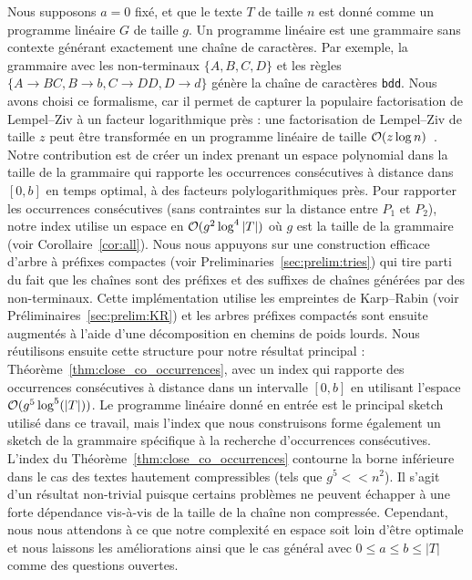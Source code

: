 Nous supposons $a=0$ fixé, et que le texte $T$ de taille $n$ est donné comme un programme linéaire $G$ de taille $g$. Un programme linéaire est une grammaire sans contexte générant exactement une chaîne de caractères. Par exemple, la grammaire avec les non-terminaux $\{A,B,C,D\}$ et les règles $\{A \rightarrow BC, B \rightarrow b, C \rightarrow DD, D\rightarrow d \}$ génère la chaîne de caractères \texttt{bdd}.
Nous avons choisi ce formalisme, car il permet de capturer la populaire factorisation de Lempel--Ziv à un facteur logarithmique près : une factorisation de Lempel--Ziv de taille $z$ peut être transformée en un programme linéaire de taille $\mathcal{O}(z\log n)$~\cite{CharikarLLPPRSS02,Rytter02}.
%
Notre contribution est de créer un index prenant un espace polynomial dans la taille de la grammaire qui rapporte les occurrences consécutives à distance dans $[0,b]$ en temps optimal, à des facteurs polylogarithmiques près.
Pour rapporter les occurrences consécutives (sans contraintes sur la distance entre $P_1$ et $P_2$), notre index utilise un espace en $\mathcal{O}(g^2\log^4|T|)$ où $g$ est la taille de la grammaire (voir Corollaire~\ref{cor:all}).
%
Nous nous appuyons sur une construction efficace d'arbre à préfixes compactes (voir Preliminaries~\ref{sec:prelim:tries}) qui tire parti du fait que les chaînes sont des préfixes et des suffixes de chaînes générées par des non-terminaux. Cette implémentation utilise les empreintes de Karp--Rabin (voir Préliminaires~\ref{sec:prelim:KR}) et les arbres préfixes compactés sont ensuite augmentés à l'aide d'une décomposition en chemins de poids lourds.
Nous réutilisons ensuite cette structure pour notre résultat principal : Théorème~\ref{thm:close_co_occurrences}, avec un index qui rapporte des occurrences consécutives à distance dans un intervalle $[0,b]$ en utilisant l'espace $\mathcal{O} (g^5\log^5(|T|))$.
%
Le programme linéaire donné en entrée est le principal sketch utilisé dans ce travail, mais l'index que nous construisons forme également un sketch de la grammaire spécifique à la recherche d'occurrences consécutives.
%
L'index du Théorème~\ref{thm:close_co_occurrences} contourne la borne inférieure dans le cas des textes hautement compressibles (tels que $g^5 << n^2$). Il s'agit d'un résultat non-trivial puisque certains problèmes ne peuvent échapper à une forte dépendance vis-à-vis de la taille de la chaîne non compressée. Cependant, nous nous attendons à ce que notre complexité en espace soit loin d'être optimale et nous laissons les améliorations ainsi que le cas général avec $0 \leq a \leq b \leq |T|$ comme des questions ouvertes.


